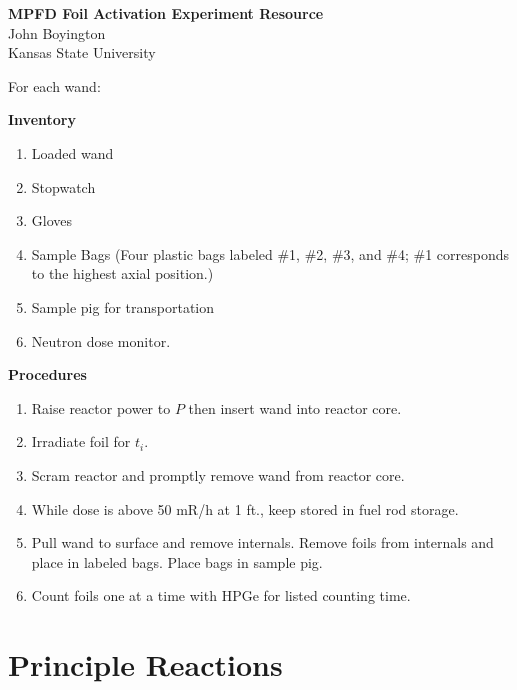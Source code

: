\documentclass[a4paper, 11pt]{article}
\begin{document}
\thispagestyle{empty}
\noindent
\large\textbf{MPFD Foil Activation Experiment Resource} \\
\hfill John Boyington \\
\hfill Kansas State University \\

\vspace{0.005\textheight}


\noindent
For each wand:

\noindent
{\bf Inventory}
\begin{enumerate}
 \item Loaded wand
 \item Stopwatch
 \item Gloves
 \item Sample Bags (Four plastic bags labeled \#1, \#2, \#3, and \#4; \#1 corresponds to the highest axial position.)
 \item Sample pig for transportation
 \item Neutron dose monitor.
\end{enumerate}

\noindent
{\bf Procedures}

\begin{enumerate}
 \item Raise reactor power to $P$ then insert wand into reactor core.
 \item Irradiate foil for $t_{i}$.
 \item Scram reactor and promptly remove wand from reactor core.
 \item While dose is above 50 mR/h at 1 ft., keep stored in fuel rod storage.
 \item Pull wand to surface and remove internals. Remove foils from internals and place in labeled bags. Place bags in sample pig.
 \item Count foils one at a time with HPGe for listed counting time.
\end{enumerate}


\newpage

\section*{Principle Reactions}
\end{document}
